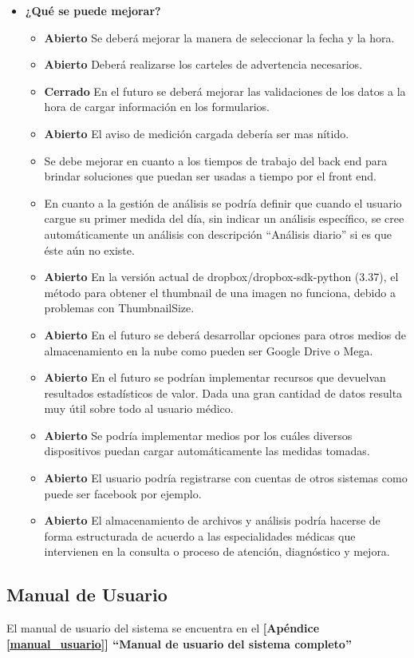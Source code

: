 \begin{itemize}
 		\item \textbf{¿Qué se puede mejorar?}
 		\begin{itemize}
 
 			\item \textbf{Abierto} Se deberá mejorar la manera de seleccionar la fecha y la hora.
 			\item \textbf{Abierto} Deberá realizarse los carteles de advertencia necesarios.
		    \item \textbf{Cerrado} En el futuro se deberá mejorar las validaciones de los datos a la hora de cargar información en los formularios. 
			 \item \textbf{Abierto}  El aviso de medición cargada debería ser mas nítido.
			 \item Se debe mejorar en cuanto a los tiempos de trabajo del back end para brindar soluciones que puedan ser usadas a tiempo por el front end.
			 \item En cuanto a la gestión de análisis se podría definir que cuando el usuario cargue su primer medida del día, sin indicar un análisis específico, se cree automáticamente un análisis con descripción ``Análisis diario'' si es que éste aún no existe.	
	          \item \textbf{Abierto} En la versión actual de dropbox/dropbox-sdk-python (3.37), el método para obtener el thumbnail de una imagen no funciona, debido a problemas con ThumbnailSize.			 		 		    
		        \item \textbf{Abierto} En el futuro se deberá desarrollar opciones para otros medios de almacenamiento en la nube como pueden ser Google Drive o Mega.	
		    \item \textbf{Abierto} En el futuro se podrían implementar recursos que devuelvan resultados estadísticos de valor. Dada una gran cantidad de datos resulta muy útil sobre todo al usuario médico.
		    \item \textbf{Abierto} Se podría implementar medios por los cuáles diversos dispositivos puedan cargar automáticamente las medidas tomadas.
		    \item \textbf{Abierto} El usuario podría registrarse con cuentas de otros sistemas como puede ser facebook por ejemplo.
		    \item \textbf{Abierto} El almacenamiento de archivos y análisis podría hacerse de forma estructurada de acuerdo a las especialidades médicas que intervienen en la consulta o proceso de atención, diagnóstico y mejora.          
 		\end{itemize}
 		
 		
 	\end{itemize}
 	
 	\subsection{Manual de Usuario}
 	El manual de usuario del sistema se encuentra en el \textbf{[Apéndice \ref{manual_usuario}] ``Manual de usuario del sistema completo''}